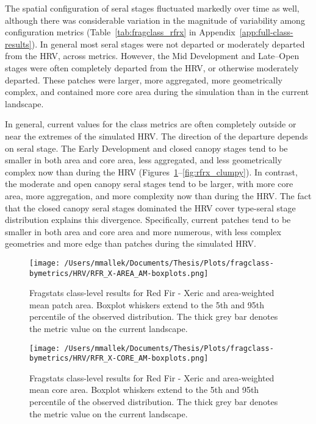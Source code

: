 The spatial configuration of seral stages fluctuated markedly over time as well, although there was considerable variation in the magnitude of variability among configuration metrics (Table~\ref{tab:fragclass_rfrx} in Appendix~\ref{app:full-class-results}). In general most seral stages were not departed or moderately departed from the HRV, across metrics. However, the Mid Development and Late--Open stages were often completely departed from the HRV, or otherwise moderately departed. These patches were larger, more aggregated, more geometrically complex, and contained more core area during the simulation than in the current landscape.

In general, current values for the class metrics are often completely outside or near the extremes of the simulated HRV. The direction of the departure depends on seral stage. The Early Development and closed canopy stages tend to be smaller in both area and core area, less aggregated, and less geometrically complex now than during the HRV (Figures~\ref{fig:rfrx_areaam}--\ref{fig:rfrx_clumpy}). In contrast, the moderate and open canopy seral stages tend to be larger, with more core area, more aggregation, and more complexity now than during the HRV. The fact that the closed canopy seral stages dominated the HRV cover type-seral stage distribution explains this divergence. Specifically, current patches tend to be smaller in both area and core area and more numerous, with less complex geometries and more edge than patches during the simulated HRV.


\begin{figure}[!htbp]
\centering
    \texttt{[image: /Users/mmallek/Documents/Thesis/Plots/fragclass-bymetrics/HRV/RFR\_X-AREA\_AM-boxplots.png]}
  \caption{Fragstats class-level results for Red Fir - Xeric and area-weighted mean patch area. Boxplot whiskers extend to the 5th and 95th percentile of the observed distribution. The thick grey bar denotes the metric value on the current landscape.}
  \label{fig:rfrx_areaam}
\end{figure}


\begin{figure}[!htbp]
\centering
    \texttt{[image: /Users/mmallek/Documents/Thesis/Plots/fragclass-bymetrics/HRV/RFR\_X-CORE\_AM-boxplots.png]}
  \caption{Fragstats class-level results for Red Fir - Xeric and area-weighted mean core area. Boxplot whiskers extend to the 5th and 95th percentile of the observed distribution. The thick grey bar denotes the metric value on the current landscape.}
  \label{fig:rfrx_coream}
\end{figure}


